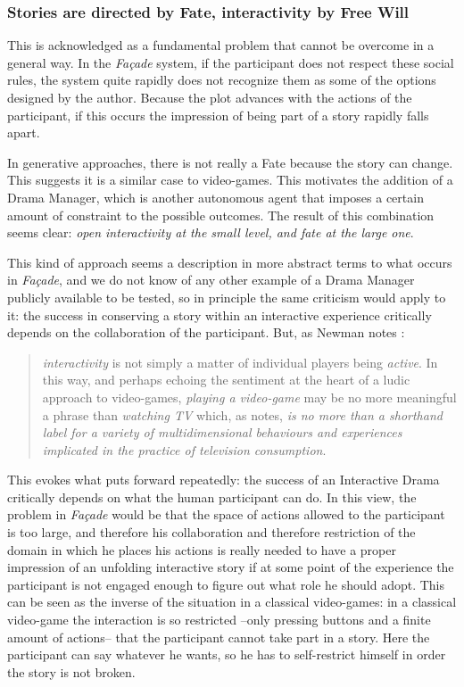 \documentclass[
		twoside,openright,titlepage,numbers=noenddot,manychapters,
		headinclude,%
                footinclude=false,cleardoublepage=empty,
                BCOR=5mm,
		fontsize=11pt, %
                 enabledeprecatedfontcommands]{scrreprt}
\begin{document}
\subsubsection{Stories are directed by Fate, interactivity by Free Will}
\label{chance_fate}

This is acknowledged as a fundamental problem that cannot be overcome in a general way. In the \emph{Façade} system, if the participant does not respect these social rules, the system quite rapidly does not recognize them as some of the options designed by the author. Because the plot advances with the actions of the participant, if this occurs the impression of being part of a story rapidly falls apart.  

In generative approaches, there is not really a Fate because the story can change. This suggests it is a similar case to video-games. This motivates the addition of a Drama Manager, which is another autonomous agent that imposes a certain amount of constraint to the possible outcomes. The result of this combination seems clear: \emph{open interactivity at the small level, and fate at the large one}. 

This kind of approach seems a description in more abstract terms to what occurs in \emph{Façade}, and we do not know of any other example of a Drama Manager publicly available to be tested,  so in principle the same criticism would apply to it: the success in conserving a story within an interactive experience critically depends on the collaboration of the participant. 
But, as Newman notes \cite[page 96]{newman2004videogames}: 


\begin{quote}
\emph{interactivity} is not simply a matter of individual players being \emph{active}. In this way, and perhaps echoing the sentiment at the heart of a ludic approach to video-games, \emph{playing a video-game} may be no more meaningful a phrase than \emph{watching TV} which, as \cite{ang1996living} notes, \emph{is no more than a shorthand label for a variety of multidimensional behaviours and experiences implicated in the practice of television consumption}.

\end{quote}


This evokes what \cite{crawford2004cci} puts forward repeatedly: the success of an Interactive Drama critically depends on what the human participant can do. In this view, the problem in \emph{Façade} would be that the space of actions allowed to the participant is too large, and therefore his collaboration and therefore restriction of the domain in which he places his actions is really needed to have a proper impression of an unfolding interactive story if at some point of the experience the participant is not engaged enough to figure out what role he should adopt. This can be seen as the inverse of the situation in a classical video-games: in a classical video-game the interaction is so restricted --only pressing buttons and a finite amount of actions-- that the participant cannot take part in a story. Here the participant can say whatever he wants, so he has to self-restrict himself in order the story is not broken.
\end{document}

